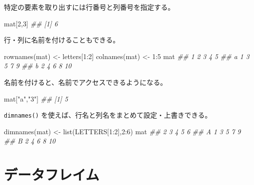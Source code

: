 \documentclass[
  letterpaper,
  xelatex,
  ja=standard, xelatex]{bxjsbook}
\newenvironment{Shaded}{\begin{snugshade}}{\end{snugshade}}
\newcommand{\DecValTok}[1]{\textcolor[rgb]{0.68,0.00,0.00}{#1}}
\newcommand{\DocumentationTok}[1]{\textcolor[rgb]{0.37,0.37,0.37}{\textit{#1}}}
\newcommand{\FunctionTok}[1]{\textcolor[rgb]{0.28,0.35,0.67}{#1}}
\newcommand{\NormalTok}[1]{\textcolor[rgb]{0.00,0.23,0.31}{#1}}
\newcommand{\OtherTok}[1]{\textcolor[rgb]{0.00,0.23,0.31}{#1}}
\newcommand{\SpecialCharTok}[1]{\textcolor[rgb]{0.37,0.37,0.37}{#1}}
\newcommand{\StringTok}[1]{\textcolor[rgb]{0.13,0.47,0.30}{#1}}
\begin{document}
特定の要素を取り出すには行番号と列番号を指定する。

\begin{Shaded}
\begin{Highlighting}[]
\NormalTok{mat[}\DecValTok{2}\NormalTok{,}\DecValTok{3}\NormalTok{]}
\DocumentationTok{\#\# [1] 6}
\end{Highlighting}
\end{Shaded}

行・列に名前を付けることもできる。

\begin{Shaded}
\begin{Highlighting}[]
\FunctionTok{rownames}\NormalTok{(mat) }\OtherTok{\textless{}{-}}\NormalTok{ letters[}\DecValTok{1}\SpecialCharTok{:}\DecValTok{2}\NormalTok{]}
\FunctionTok{colnames}\NormalTok{(mat) }\OtherTok{\textless{}{-}} \DecValTok{1}\SpecialCharTok{:}\DecValTok{5}
\NormalTok{mat}
\DocumentationTok{\#\#   1 2 3 4  5}
\DocumentationTok{\#\# a 1 3 5 7  9}
\DocumentationTok{\#\# b 2 4 6 8 10}
\end{Highlighting}
\end{Shaded}

名前を付けると、名前でアクセスできるようになる。

\begin{Shaded}
\begin{Highlighting}[]
\NormalTok{mat[}\StringTok{"a"}\NormalTok{,}\StringTok{"3"}\NormalTok{]}
\DocumentationTok{\#\# [1] 5}
\end{Highlighting}
\end{Shaded}

\texttt{dimnames()} を使えば、行名と列名をまとめて設定・上書きできる。

\begin{Shaded}
\begin{Highlighting}[]
\FunctionTok{dimnames}\NormalTok{(mat) }\OtherTok{\textless{}{-}} \FunctionTok{list}\NormalTok{(LETTERS[}\DecValTok{1}\SpecialCharTok{:}\DecValTok{2}\NormalTok{],}\DecValTok{2}\SpecialCharTok{:}\DecValTok{6}\NormalTok{)}
\NormalTok{mat}
\DocumentationTok{\#\#   2 3 4 5  6}
\DocumentationTok{\#\# A 1 3 5 7  9}
\DocumentationTok{\#\# B 2 4 6 8 10}
\end{Highlighting}
\end{Shaded}

\section{データフレイム}\label{ux30c7ux30fcux30bfux30d5ux30ecux30a4ux30e0}
\end{document}
